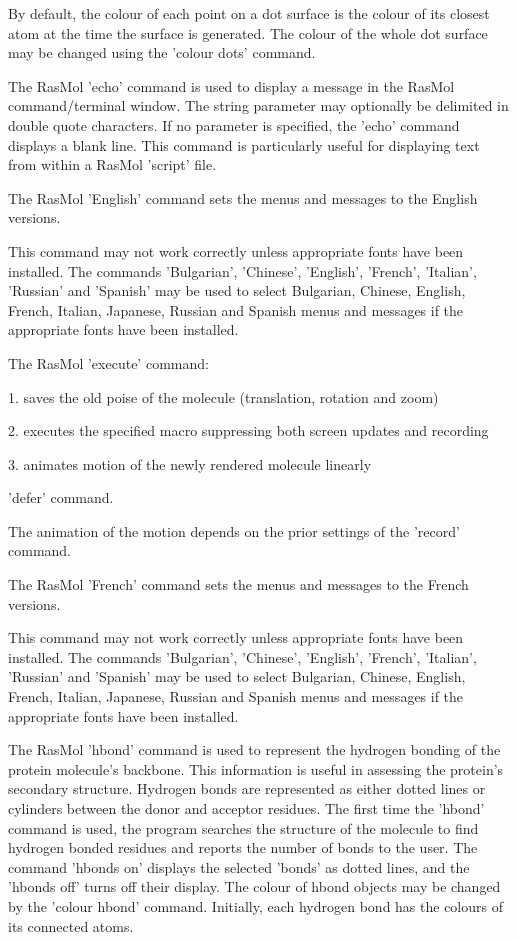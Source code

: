 By default, the colour of each point on a dot surface is the colour
of its closest atom at the time the surface is generated. The colour
of the whole dot surface may be changed using the
'colour dots'
command.

The RasMol
'echo'
command is used to display a message in the RasMol command/terminal
window. The string parameter may optionally be delimited in double
quote characters. If no parameter is specified, the
'echo'
command displays a blank line. This command is particularly useful
for displaying text from within a RasMol
'script'
file.

The RasMol
'English'
command sets the menus and messages to the English versions.

This command may not work correctly unless appropriate fonts
have been installed.  The commands
'Bulgarian',
'Chinese',
'English',
'French',
'Italian',
'Russian'
and
'Spanish'
may be used to select Bulgarian, Chinese, English, French,
Italian, Japanese, Russian and Spanish menus and messages if the
appropriate fonts have been installed.

The RasMol
'execute'
command:

1.  saves the old poise of the molecule (translation,
rotation and zoom)

2. executes the specified macro suppressing both screen
updates and recording

3. animates motion of the newly rendered molecule linearly

'defer'
command.

The animation of the motion depends on the prior settings of the
'record'
command.

The RasMol
'French'
command sets the menus and messages to the French versions.

This command may not work correctly unless appropriate fonts
have been installed.  The commands
'Bulgarian',
'Chinese',
'English',
'French',
'Italian',
'Russian'
and
'Spanish'
may be used to select Bulgarian, Chinese, English, French,
Italian, Japanese, Russian and Spanish menus and messages if the
appropriate fonts have been installed.

The RasMol
'hbond'
command is used to represent the hydrogen bonding of the protein
molecule's backbone. This information is useful in assessing the
protein's secondary structure. Hydrogen bonds are represented as
either dotted lines or cylinders between the donor and acceptor
residues. The first time the
'hbond'
command is used, the program searches the structure of the
molecule to find hydrogen bonded residues and reports the number of bonds
to the user. The command
'hbonds on'
displays the selected 'bonds' as dotted lines, and the
'hbonds off'
turns off their display. The colour of hbond objects may be changed
by the
'colour hbond'
command. Initially, each hydrogen bond has the colours of its connected
atoms.

